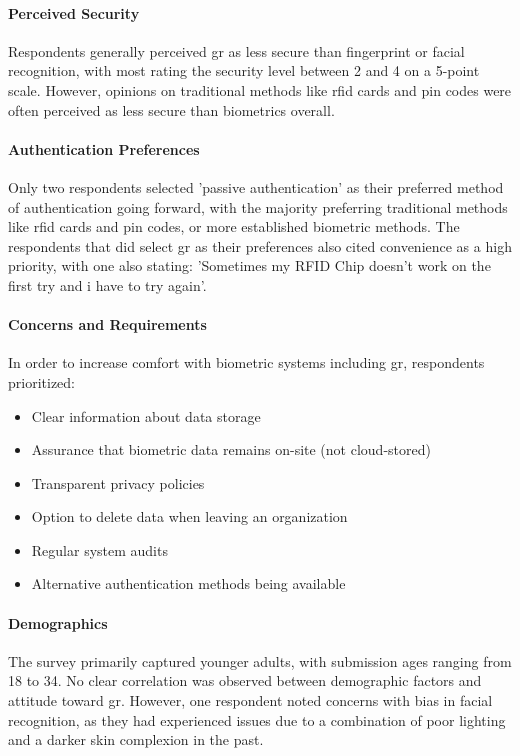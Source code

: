 \paragraph{Perceived Security} Respondents generally perceived \ac{gr} as less secure than fingerprint or facial recognition, with most rating the security level between 2 and 4 on a 5-point scale. However, opinions on traditional methods like \ac{rfid} cards and \ac{pin} codes were often perceived as less secure than biometrics overall.

\paragraph{Authentication Preferences} Only two respondents selected 'passive authentication' as their preferred method of authentication going forward, with the majority preferring traditional methods like \ac{rfid} cards and \ac{pin} codes, or more established biometric methods. The respondents that did select \ac{gr} as their preferences also cited convenience as a high priority, with one also stating: 'Sometimes my RFID Chip doesn't work on the first try and i have to try again'.

\paragraph{Concerns and Requirements} In order to increase comfort with biometric systems including \ac{gr}, respondents prioritized:

\begin{itemize}
    \item Clear information about data storage
    \item Assurance that biometric data remains on-site (not cloud-stored)
    \item Transparent privacy policies
    \item Option to delete data when leaving an organization
    \item Regular system audits
    \item Alternative authentication methods being available
\end{itemize}

\paragraph{Demographics} The survey primarily captured younger adults, with submission ages ranging from 18 to 34. No clear correlation was observed between demographic factors and attitude toward \ac{gr}. However, one respondent noted concerns with bias in facial recognition, as they had experienced issues due to a combination of poor lighting and a darker skin complexion in the past.

